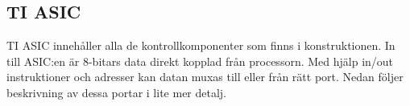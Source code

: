 \documentclass[main.tex]{subfiles}
\begin{document}
\subsection{TI ASIC}

TI ASIC innehåller alla de kontrollkomponenter som finns i konstruktionen. In till ASIC:en är 8-bitars data direkt kopplad från processorn. Med hjälp in/out instruktioner och adresser kan datan muxas till eller från rätt port. Nedan följer beskrivning av dessa portar i lite mer detalj.


\end{document}

